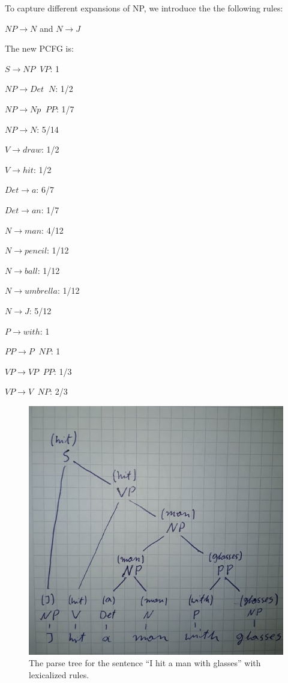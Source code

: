 \documentclass{article}
\begin{document}
\begin{enumerate}[label = (\alph*)]
    
    
    \item
    To capture different expansions of NP, we introduce the the following rules:
    
    $NP \to N$ and $N \to J$
    
    The new PCFG is:
    
    $S \to NP \;\; VP$: 1
    
    $NP \to Det \;\; N$: 1/2
    
    $NP \to Np \;\; PP$: 1/7
    
    $NP \to N$: 5/14
    
    $V \to draw$: 1/2
    
    $V \to hit$: 1/2
    
    $Det \to a$: 6/7
    
    $Det \to an$: 1/7
    
    $N \to man$: 4/12
    
    $N \to pencil$: 1/12
    
    $N \to ball$: 1/12
    
    $N \to umbrella$: 1/12
    
    $N \to J$: 5/12 
    
    $P \to with$: 1
    
    $PP \to P \;\; NP$: 1
    
    $VP \to VP \;\; PP$: 1/3
    
    $VP \to V \;\; NP$: 2/3
     
	\begin{figure}[H]
	\item
    \centering
    \includegraphics[scale=1.5]{figures/tree.jpg}
    \caption{The parse tree for the sentence “I hit a man with glasses” with 		lexicalized rules.}
	\end{figure}
	

\end{enumerate}
\end{document}

